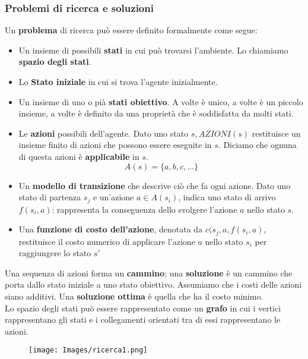 \documentclass{article}
\begin{document}
\subsubsection{Problemi di ricerca e soluzioni}
Un \textbf{problema} di ricerca può essere definito formalmente come segue:
\begin{itemize}
    \item Un insieme di possibili \textbf{stati} in cui può trovarsi l'ambiente. Lo chiamiamo \textbf{spazio degli stati}.
    \item Lo \textbf{Stato iniziale} in cui si trova l'agente inizialmente.
    \item Un insieme di uno o pià \textbf{stati obiettivo}. A volte è unico, a volte è un piccolo insieme, a volte è definito da una proprietà che è soddisfatta da molti stati.
    \item Le \textbf{azioni} possibili dell'agente. Dato uno stato $s, AZIONI(s)$ restituisce un insieme finito di azioni che possono essere eseguite in $s$. Diciamo che ognuna di questa azioni è \textbf{applicabile} in $s$.
    \[ A(s)=\{a,b,c,...\}\]
    \item Un \textbf{modello di transizione} che descrive ciò che fa ogni azione. Dato uno stato di partenza $s_j$ e un'azione $a \in A(s_i)$, indica uno stato di arrivo $f(s_i,a)$: rappresenta la conseguenza dello svolgere l'azione $a$ nello stato $s$.
    \item Una \textbf{funzione di costo dell'azione}, denotata da $c(s_j,a,f(s_i,a)$, restituisce il costo numerico di applicare l'azione $a$ nello stato $s_i$ per raggiungere lo stato $s'$
    
\end{itemize}
Una sequenza di azioni forma un \textbf{cammino}; una \textbf{soluzione} è un cammino che porta dallo stato iniziale a uno stato obiettivo. Assumiamo che i costi delle azioni siano additivi. Una \textbf{soluzione ottima} è quella che ha il costo minimo. \\ Lo spazio degli stati può essere rappresentato come un \textbf{grafo} in cui i vertici rappresentano gli stati e i collegamenti orientati tra di essi rappresentano le azioni.

\begin{figure}[H]
    \centering
    \texttt{[image: Images/ricerca1.png]}
\end{figure}
\end{document}
